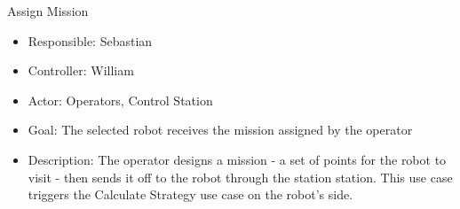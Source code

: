 Assign Mission
\begin{itemize}
    \item Responsible: Sebastian
    \item Controller: William
    \item Actor: Operators, Control Station
    \item Goal: The selected robot receives the mission assigned by the operator
    \item Description: The operator designs a mission - a set of points for the robot to visit - then sends it off to the robot through the station station. This use case triggers the Calculate Strategy use case on the robot's side.
\end{itemize}
